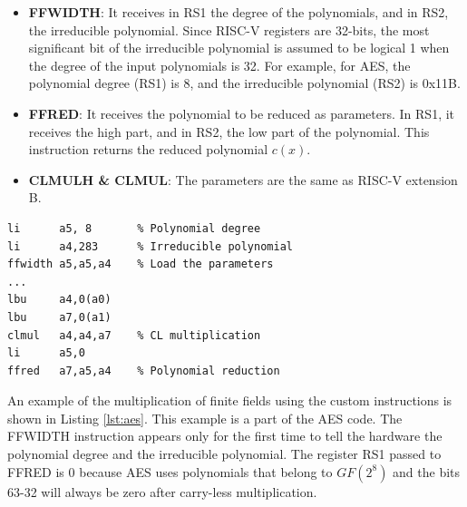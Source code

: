 \begin{itemize}
    \item \textbf{FFWIDTH}: It receives in RS1 the degree of the polynomials, and in RS2, the irreducible polynomial. Since RISC-V registers are 32-bits, 
    the most significant bit of the irreducible polynomial is assumed to be logical 1 when the degree of the input polynomials is 32. For example, for AES, 
    the polynomial degree (RS1) is 8, and the irreducible polynomial (RS2) is 0x11B.
    \item \textbf{FFRED}: It receives the polynomial to be reduced as parameters. In RS1, it receives the high part, and in RS2, the low part of the polynomial. 
    This instruction returns the reduced polynomial $c(x)$. 
    \item \textbf{CLMULH \& CLMUL}: The parameters are the same as RISC-V extension B.
\end{itemize}

\begin{lstlisting}[caption={GF multiplication for AES},captionpos=b,label={lst:aes}]
li	    a5, 8       % Polynomial degree
li	    a4,283      % Irreducible polynomial
ffwidth	a5,a5,a4    % Load the parameters
...
lbu	    a4,0(a0)
lbu	    a7,0(a1)
clmul	a4,a4,a7    % CL multiplication
li	    a5,0
ffred	a7,a5,a4    % Polynomial reduction
\end{lstlisting}

An example of the multiplication of finite fields using the custom instructions is shown in Listing \ref{lst:aes}. 
This example is a part of the AES code. The FFWIDTH instruction appears only for the first time to tell the hardware 
the polynomial degree and the irreducible polynomial. 
The register RS1 passed to FFRED is 0 because AES uses polynomials that belong to $GF(2^8)$ 
and the bits 63-32 will always be zero after carry-less multiplication.

